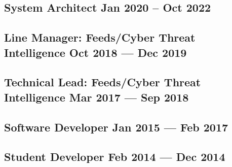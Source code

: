 
\subsection{{System Architect \hfill Jan 2020 -- Oct 2022}}
%

\subsection{{Line Manager: Feeds/Cyber Threat Intelligence \hfill Oct 2018 --- Dec 2019}}


\subsection{{Technical Lead: Feeds/Cyber Threat Intelligence \hfill Mar 2017 --- Sep 2018}}

\subsection{{Software Developer \hfill Jan 2015 --- Feb 2017}}

\subsection{{Student Developer \hfill Feb 2014 --- Dec 2014}}

